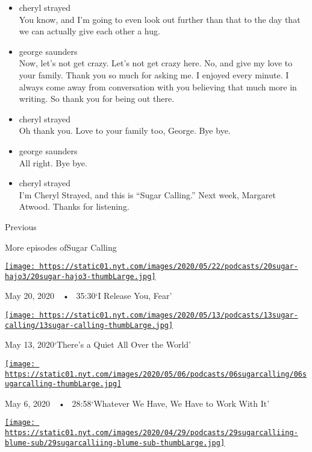 \begin{itemize}
\item
  cheryl strayed\\
  You know, and I'm going to even look out further than that to the day
  that we can actually give each other a hug.
\item
  george saunders\\
  Now, let's not get crazy. Let's not get crazy here. No, and give my
  love to your family. Thank you so much for asking me. I enjoyed every
  minute. I always come away from conversation with you believing that
  much more in writing. So thank you for being out there.
\item
  cheryl strayed\\
  Oh thank you. Love to your family too, George. Bye bye.
\item
  george saunders\\
  All right. Bye bye.
\item
  cheryl strayed\\
  I'm Cheryl Strayed, and this is ``Sugar Calling.'' Next week, Margaret
  Atwood. Thanks for listening.
\end{itemize}

Previous

More episodes ofSugar Calling

\href{https://www.nytimes.com/2020/05/20/podcasts/sugar-calling-joy-harjo-poetry-virus.html?action=click\&module=audio-series-bar\&region=header\&pgtype=Article}{\texttt{[image: https://static01.nyt.com/images/2020/05/22/podcasts/20sugar-hajo3/20sugar-hajo3-thumbLarge.jpg]}}

May 20, 2020~~•~ 35:30`I Release You, Fear'

\href{https://www.nytimes.com/2020/05/13/podcasts/sugar-calling-billy-collins-poetry-virus.html?action=click\&module=audio-series-bar\&region=header\&pgtype=Article}{\texttt{[image: https://static01.nyt.com/images/2020/05/13/podcasts/13sugar-calling/13sugar-calling-thumbLarge.jpg]}}

May 13, 2020`There's a Quiet All Over the World'

\href{https://www.nytimes.com/2020/05/06/podcasts/sugar-calling-alice-walker-quarantine-virus.html?action=click\&module=audio-series-bar\&region=header\&pgtype=Article}{\texttt{[image: https://static01.nyt.com/images/2020/05/06/podcasts/06sugarcalling/06sugarcalling-thumbLarge.jpg]}}

May 6, 2020~~•~ 28:58`Whatever We Have, We Have to Work With It'

\href{https://www.nytimes.com/2020/04/29/podcasts/sugar-calling-judy-blume-quarantine-virus.html?action=click\&module=audio-series-bar\&region=header\&pgtype=Article}{\texttt{[image: https://static01.nyt.com/images/2020/04/29/podcasts/29sugarcalliing-blume-sub/29sugarcalliing-blume-sub-thumbLarge.jpg]}}

